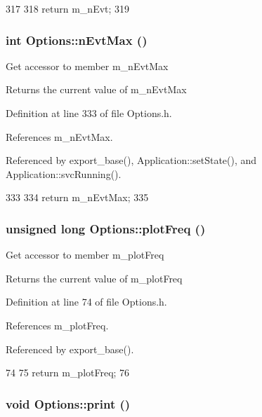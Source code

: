 \begin{DoxyCode}
317                               {
318                 return m_nEvt;
319         }
\end{DoxyCode}
\hypertarget{classOptions_ad1f3b03d734c806a2feca418b26bcc9b}{
\subsubsection[{nEvtMax}]{\setlength{\rightskip}{0pt plus 5cm}int Options::nEvtMax ()}}
\label{classOptions_ad1f3b03d734c806a2feca418b26bcc9b}
Get accessor to member m\_\-nEvtMax \begin{DoxyReturn}{Returns}
the current value of m\_\-nEvtMax 
\end{DoxyReturn}


Definition at line 333 of file Options.h.

References m\_\-nEvtMax.

Referenced by export\_\-base(), Application::setState(), and Application::svcRunning().


\begin{DoxyCode}
333                        {
334                 return m_nEvtMax;
335         }
\end{DoxyCode}
\hypertarget{classOptions_a1e20abb20c1a2187f9455b39cd9d26ae}{
\subsubsection[{plotFreq}]{\setlength{\rightskip}{0pt plus 5cm}unsigned long Options::plotFreq ()}}
\label{classOptions_a1e20abb20c1a2187f9455b39cd9d26ae}
Get accessor to member m\_\-plotFreq \begin{DoxyReturn}{Returns}
the current value of m\_\-plotFreq 
\end{DoxyReturn}


Definition at line 74 of file Options.h.

References m\_\-plotFreq.

Referenced by export\_\-base().


\begin{DoxyCode}
74                                   {
75                 return m_plotFreq;
76         }
\end{DoxyCode}
\hypertarget{classOptions_a3f4593f64bc8c8afc3ade9237adb83e1}{
\subsubsection[{print}]{\setlength{\rightskip}{0pt plus 5cm}void Options::print ()}}
\label{classOptions_a3f4593f64bc8c8afc3ade9237adb83e1}


